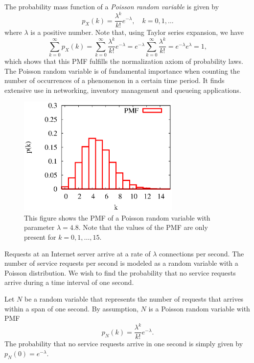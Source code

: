 The probability mass function of a \emph{Poisson random variable} is given by 
\begin{equation*}
p_X (k) = \frac{\lambda^k}{k!} e^{- \lambda}, \quad k = 0, 1, \ldots
\end{equation*}
where $\lambda$ is a positive number.
Note that, using Taylor series expansion,  we have
\begin{equation*}
\sum_{k = 0}^{\infty} p_X (k)
= \sum_{k = 0}^{\infty} \frac{\lambda^k}{k!} e^{- \lambda}
= e^{- \lambda} \sum_{k = 0}^{\infty} \frac{\lambda^k}{k!}
= e^{- \lambda} e^{\lambda} = 1 ,
\end{equation*}
which shows that this PMF fulfills the normalization axiom of probability laws.
The Poisson random variable is of fundamental importance when counting the number of occurrences of a phenomenon in a certain time period.
It finds extensive use in networking, inventory management and queueing applications.

\begin{figure}[ht]
\begin{center}
\includegraphics[width=8cm]{Figures/5chapter/poisson}
\caption{This figure shows the PMF of a Poisson random variable with parameter $\lambda = 4.8$.  Note that the values of the PMF are only present for $k = 0, 1, \ldots, 15$.}
\end{center}
\end{figure}

\begin{example}
Requests at an Internet server arrive at a rate of $\lambda$ connections per second.
The number of service requests per second is modeled as a random variable with a Poisson distribution.
We wish to find the probability that no service requests arrive during a time interval of one second.

Let $N$ be a random variable that represents the number of requests that arrives within a span of one second.
By assumption, $N$ is a Poisson random variable with PMF
\begin{equation*}
p_N (k) = \frac{ \lambda^k }{k!} e^{-\lambda} .
\end{equation*}
The probability that no service requests arrive in one second is simply given by $p_N (0) = e^{-\lambda}$.
\end{example}

